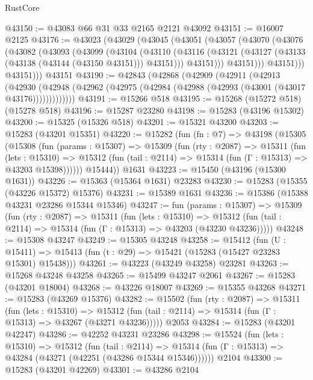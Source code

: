 \begin{lexlean}{RustCore}
\begin{coremodule}
@43150 := @43083 @66 @31 @33 @2165 @2121 @43092
@43151 := @16007 @2125
@43176 := @43023
    (@43029
      (@43045
        (@43051
          (@43057
            (@43070
              (@43076
                (@43082
                  (@43093
                    (@43099
                      (@43104
                        (@43110
                          (@43116
                            (@43121 (@43127 (@43133 (@43138 (@43144 (@43150 @43151))) @43151)))
                            @43151)))
                      @43151)))
                @43151)))
          @43151)))
    @43151
@43190 := @42843
    (@42868
      (@42909
        (@42911
          (@42913
            (@42930
              (@42948 (@42962 (@42975 (@42984 (@42988 (@42993 (@43001 (@43017 @43176)))))))))))))
@43191 := @15266 @518
@43195 := @15268 (@15272 @518) (@15278 @518)
@43196 := @15287 @23280
@43198 := @15283 (@43196 @15302)
@43200 := @15325 (@15326 @518)
@43201 := @15321 @43200
@43203 := @15283 (@43201 @15351)
@43220 := @15282
    (fun (fn : @7) =>
    @43198
      (@15305
        (@15308
          (fun (params : @15307) =>
          @15309
            (fun (rty : @2087) =>
            @15311
              (fun (lets : @15310) =>
              @15312 (fun (tail : @2114) => @15314 (fun (Γ : @15313) => @43203 @15398))))))
        @15444))
    @1631
@43223 := @15450 (@43196 (@15300 @1631))
@43226 := @15363 (@15364 @1631) @23283
@43230 := @15283 (@15355 (@43226 @15372) @15376)
@43231 := @15389 @1631
@43236 := @15386 (@15388 @43231 @23286 @15344 @15346)
@43247 := fun (params : @15307) =>
  @15309
    (fun (rty : @2087) =>
    @15311
      (fun (lets : @15310) =>
      @15312 (fun (tail : @2114) => @15314 (fun (Γ : @15313) => @43203 (@43230 @43236)))))
@43248 := @15308 @43247
@43249 := @15305 @43248
@43258 := @15412
    (fun (U : @15411) => @15413 (fun (t : @29) => @15421 (@15283 (@15427 @23283 @15301) @15438)))
@43261 := @43223 (@43249 @43258) @23281
@43263 := @15268 @43248 @43258
@43265 := @15499 @43247 @2061
@43267 := @15283 (@43201 @18004)
@43268 := @43226 @18007
@43269 := @15355 @43268
@43271 := @15283 (@43269 @15376)
@43282 := @15502
    (fun (rty : @2087) =>
    @15311
      (fun (lets : @15310) =>
      @15312 (fun (tail : @2114) => @15314 (fun (Γ : @15313) => @43267 (@43271 @43236)))))
    @2053
@43284 := @15283 (@43201 @42247)
@43286 := @42252 @43231 @23286
@43298 := @15524
    (fun (lets : @15310) =>
    @15312
      (fun (tail : @2114) =>
      @15314 (fun (Γ : @15313) => @43284 (@43271 (@42251 (@43286 @15344 @15346))))))
    @2104
@43300 := @15283 (@43201 @42269)
@43301 := @43286 @2104

\end{coremodule}
\end{lexlean}
